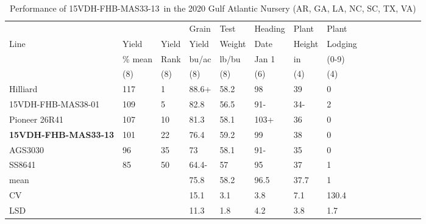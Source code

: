 \documentclass[12pt, letterpaper]{article}
\newcommand{\lin}{15VDH-FHB-MAS33-13~}
\begin{document}
\begin{landscape}
\begin{table}[ht]
\caption{Performance of \lin in the 2020 Gulf Atlantic Nursery (AR, GA, LA, NC, SC, TX, VA)}
\label{gawn}
\begin{tabular}{lllllllllllllll}
  \hline
     &         &       & Grain & Test   & Heading & Plant  & Plant   \\
Line & Yield   & Yield & Yield & Weight & Date    & Height & Lodging \\
     & \% mean & Rank  & bu/ac & lb/bu  & Jan 1   & in     & (0-9)   \\
     & (8)     & (8)   & (8)   & (8)    & (6)     & (4)    & (4)     \\
  \hline
  Hilliard           & 117 &  1   & 88.6+ & 58.2 & 98   & 39   & 0     \\
  15VDH-FHB-MAS38-01 & 109 &  5   & 82.8  & 56.5 & 91-  & 34-  & 2     \\    
  Pioneer 26R41      & 107 & 10   & 81.3  & 58.1 & 103+ & 36   & 0     \\    
  \textbf{15VDH-FHB-MAS33-13} & 101 & 22   & 76.4  & 59.2 & 99   & 38   & 0     \\    
  AGS3030            &  96 & 35   & 73    & 58.1 & 91-  & 35   & 0     \\    
  SS8641             &  85 & 50   & 64.4- & 57   & 95   & 37   & 1     \\    
  mean               &     &      & 75.8  & 58.2 & 96.5 & 37.7 & 1     \\  
  CV                 &     &      & 15.1  & 3.1  & 3.8  & 7.1  & 130.4 \\
  LSD                &     &      & 11.3  & 1.8  & 4.2  & 3.8  & 1.7   \\
   \hline
\end{tabular}

\bigskip


\end{table}
\end{landscape}
\end{document}
